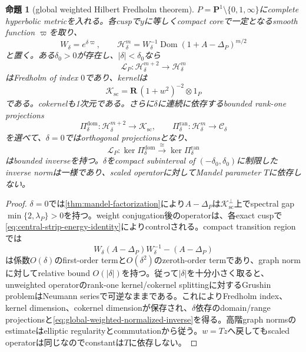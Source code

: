 \documentclass[11pt,a4paper]{ltjsarticle}
\newtheorem{proposition}[theorem]{命題}
\theoremstyle{definition}
\theoremstyle{remark}
\newcommand{\PP}{\mathbf P}
\newcommand{\RR}{\mathbf R}
\begin{document}
\begin{proposition}[global weighted Hilbert Fredholm theorem]\label{prop:global-weighted-Hilbert-parametrix}
$P=\PP^1\setminus\{0,1,\infty\}$にcomplete hyperbolic metricを入れる。各cuspで$y$に等しくcompact coreで一定となるsmooth function $\varpi$を取り、
\[
 W_\delta=e^{\delta\varpi},
 \qquad
 \mathcal H^m_\delta
 =W_\delta^{-1}\operatorname{Dom}(1+A-\Delta_P)^{m/2}
\]
と置く。ある$\delta_0>0$が存在し、$|\delta|<\delta_0$なら
\begin{equation}\label{eq:global-weighted-parametrix-map}
 \mathscr L_P:\mathcal H^{m+2}_\delta\longrightarrow\mathcal H^m_\delta
\end{equation}
はFredholm of index $0$であり、kernelは
\[
 \mathcal K_{\mathrm{sc}}
 =\RR\,(1+w^2)^{-2}\otimes1_P
\]
である。cokernelも1次元である。さらに$\delta$に連続に依存するbounded rank-one projections
\[
 \Pi^{\mathrm{dom}}_\delta:\mathcal H^{m+2}_\delta\to\mathcal K_{\mathrm{sc}},
 \qquad
 \Pi^{\mathrm{ran}}_\delta:\mathcal H^m_\delta\to\mathcal C_\delta
\]
を選べて、$\delta=0$ではorthogonal projectionsとなり、
\begin{equation}\label{eq:global-weighted-normalized-inverse}
 \mathscr L_P:
 \ker\Pi^{\mathrm{dom}}_\delta
 \xrightarrow{\ \cong\ }
 \ker\Pi^{\mathrm{ran}}_\delta
\end{equation}
はbounded inverseを持つ。$\delta$をcompact subinterval of $(-\delta_0,\delta_0)$に制限したinverse normは一様であり、scaled operatorに対してMandel parameter $T$に依存しない。
\end{proposition}

\begin{proof}
$\delta=0$では\cref{thm:mandel-factorization}により$A-\Delta_P$は$\mathcal K_{\mathrm{sc}}^\perp$上でspectral gap
$\min\{2,\lambda_P\}>0$を持つ。weight conjugation後のoperatorは、各exact cuspで\eqref{eq:central-strip-energy-identity}によりcontrolされる。compact transition regionでは
\[
 W_\delta(A-\Delta_P)W_\delta^{-1}-(A-\Delta_P)
\]
は係数$O(\delta)$のfirst-order termと$O(\delta^2)$のzeroth-order termであり、graph normに対してrelative bound $O(|\delta|)$を持つ。従って$|\delta|$を十分小さく取ると、unweighted operatorのrank-one kernel/cokernel splittingに対するGrushin problemはNeumann seriesで可逆なままである。これによりFredholm index、kernel dimension、cokernel dimensionが保存され、$\delta$依存のdomain/range projectionsと\eqref{eq:global-weighted-normalized-inverse}を得る。高階graph normsのestimateはelliptic regularityとcommutationから従う。$w=Tz$へ戻してもscaled operatorは同じなのでconstantは$T$に依存しない。
\end{proof}
\end{document}
